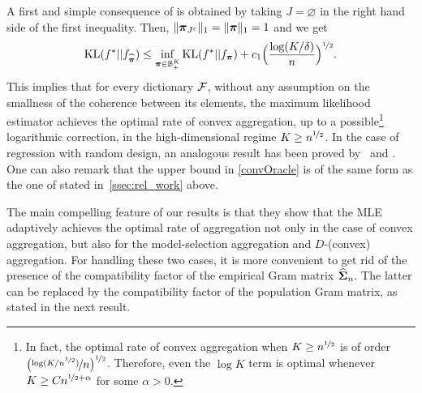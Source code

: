 A first and simple consequence of  is obtained by taking $J=\varnothing$ in the right hand
side of the first inequality. Then, $\|\boldsymbol \pi_{J^c}\|_1=\|\boldsymbol \pi\|_1=1$ and we get
\begin{equation}
{\rm KL}(f^*|| f_{\widehat{\boldsymbol \pi}}) \leq \inf_{\boldsymbol \pi \in {\mathbb B}_+^K}
{\rm KL}(f^*|| f_{\boldsymbol \pi}) + c_1\Big(\frac{\log(K/\delta)}{n}\Big)^{\nicefrac12}.\label{convOracle}
\end{equation}
This implies that for every dictionary $\cal F$, without any assumption on the smallness of the coherence 
between its elements, the maximum likelihood estimator achieves the optimal rate of convex aggregation, up
to a possible\footnote{In fact, the optimal rate of convex aggregation when $K\ge n^{\nicefrac12}$ is of
	order $\normalsize\big(\nicefrac{\log(K/n^{\nicefrac12})}{\displaystyle n}\big)^{\nicefrac12}$. Therefore, even the 
	$\log K$ term is optimal whenever $K\ge C n^{\nicefrac12+\alpha}$ for some $\alpha>0$.} logarithmic 
correction, in the high-dimensional regime $K\ge n^{\nicefrac12}$. In the case of regression with random 
design, an analogous result has been proved by~\cite{LecueMend13} and \cite{Lecue13}. 
One can also remark that the upper bound in \eqref{convOracle} is of the same form as the one of  
stated in~\cref{ssec:rel_work} above.

The main compelling feature  of our results is that they show that the MLE adaptively achieves the optimal rate of
aggregation not only in the case of convex aggregation, but also for the model-selection aggregation and $D$-(convex)
aggregation. For handling these two cases, it is more convenient to get rid of the presence of the compatibility
factor of the empirical Gram matrix $\widehat{\boldsymbol\Sigma}_n$.  The latter can be replaced by the compatibility factor of
the population Gram matrix, as stated in the next result.

